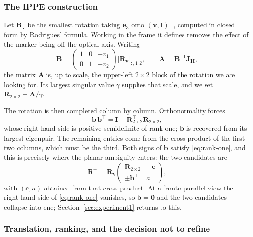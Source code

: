 \documentclass[11pt,a4paper]{article}
\theoremstyle{definition}
\theoremstyle{plain}
\theoremstyle{remark}
\begin{document}
\subsubsection{The IPPE construction}

Let $\mathbf{R}_{\mathbf v}$ be the smallest rotation taking $\mathbf{e}_3$ onto
$(\mathbf{v},1)^\top$, computed in closed form by Rodrigues' formula. Working in
the frame it defines removes the effect of the marker being off the optical
axis. Writing
\begin{equation}
  \mathbf{B} =
  \begin{pmatrix} 1 & 0 & -v_1 \\ 0 & 1 & -v_2 \end{pmatrix}
  \big[\mathbf{R}_{\mathbf v}\big]_{:,1:2},
  \qquad
  \mathbf{A} = \mathbf{B}^{-1}\mathbf{J}_{\mathbf H},
\end{equation}
the matrix $\mathbf{A}$ is, up to scale, the upper-left $2\times2$ block of the
rotation we are looking for. Its largest singular value $\gamma$ supplies that
scale, and we set $\mathbf{R}_{2\times2} = \mathbf{A}/\gamma$.

The rotation is then completed column by column. Orthonormality forces
\begin{equation}
  \mathbf{b}\,\mathbf{b}^\top
  = \mathbf{I} - \mathbf{R}_{2\times2}^\top\mathbf{R}_{2\times2},
  \label{eq:rank-one}
\end{equation}
whose right-hand side is positive semidefinite of rank one; $\mathbf{b}$ is
recovered from its largest eigenpair. The remaining entries come from the
cross product of the first two columns, which must be the third. Both signs of
$\mathbf{b}$ satisfy \eqref{eq:rank-one}, and this is precisely where the
planar ambiguity enters: the two candidates are
\begin{equation}
  \mathbf{R}^{\pm} = \mathbf{R}_{\mathbf v}
  \begin{pmatrix}
    \mathbf{R}_{2\times2} & \pm\mathbf{c} \\[2pt]
    \pm\mathbf{b}^\top & a
  \end{pmatrix},
\end{equation}
with $(\mathbf{c},a)$ obtained from that cross product. At a fronto-parallel
view the right-hand side of \eqref{eq:rank-one} vanishes, so $\mathbf{b} =
\mathbf{0}$ and the two candidates collapse into one; Section~\ref{sec:experiment1}
returns to this.

\subsubsection{Translation, ranking, and the decision not to refine}
\end{document}
